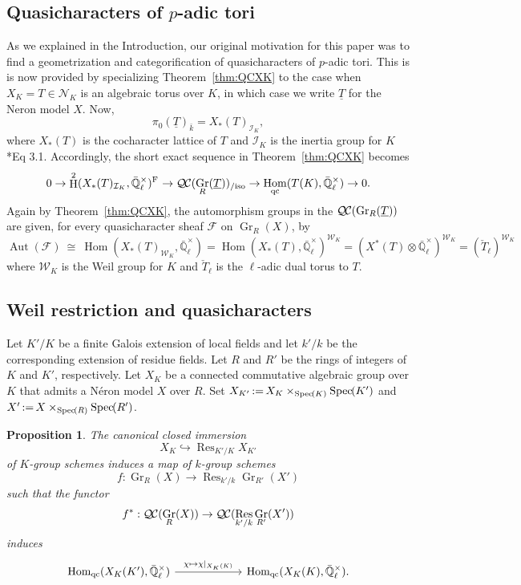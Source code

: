 \documentclass{amsart}
\theoremstyle{plain}
\newtheorem{proposition}[theorem]{Proposition}
\theoremstyle{definition}
\theoremstyle{remark}
\newcommand{\EE}{\mathbb{\bar Q}_\ell}
\newcommand{\bFq}{\bar{k}}
\newcommand{\Fq}{k}
\newcommand{\EEx}{\EE^\times}
\newcommand{\Weil}[1]{\mathcal{W}_{#1}}
\newcommand{\Frob}[1]{\operatorname{F}_{#1}}
\DeclareMathOperator{\Aut}{Aut}
\DeclareMathOperator{\Hom}{Hom}
\DeclareMathOperator{\Gr}{Gr}
\DeclareMathOperator{\Hh}{H}
\DeclareMathOperator{\Res}{Res}
\newcommand{\Spec}[1]{{\operatorname{Spec}\hskip-1pt( #1 )}}
\newcommand{\ceq}{{\, :=\, }}
\newcommand{\iso}{{\ \cong\ }}
\newcommand{\qcs}[1]{{\mathcal{#1}}}
\newcommand{\QC}{{\mathcal{Q\hskip-0.8pt C}}}
\newcommand{\QCiso}[1]{\QC(#1)_{/\text{iso}}}
\begin{document}
\subsection{Quasicharacters of $p$-adic tori}

As we explained in the Introduction, our original motivation for this paper was to find a geometrization and categorification of quasicharacters of $p$-adic tori. This is is now provided by specializing Theorem~\ref{thm:QCXK} to the case when $X_K= T\in \mathcal{N}_K$ is an algebraic torus over $K$, in which case we write $\underline{T}$ for the Neron model $X$. Now,
\[
 \pi_0(\underline{T})_{\bFq} = X_*(T)_{\mathcal{I}_K},
\]
where $X_*(T)$ is the cocharacter lattice of $T$ and $\mathcal{I}_K$ is the inertia group for $K$ \cite{bitan:discriminant}*{Eq 3.1}. 
Accordingly, the short exact sequence in Theorem~\ref{thm:QCXK} becomes
\begin{equation}
0 \to \Hh^2(X_*(T)_{\mathcal{I}_K},\EEx)^{\Frob{}} \to \QCiso{\Gr_R(\underline{T})} \to \Hom_\text{qc}(T(K),\EEx) \to 0.
\end{equation}
Again by Theorem~\ref{thm:QCXK}, the automorphism groups in the $\QC(\Gr_R(\underline{T}))$ are given, for every quasicharacter sheaf $\qcs{F}$ on $\Gr_R(X)$, by
\begin{equation}
\Aut(\qcs{F}) \iso \Hom(X_*(T)_{\Weil{K}},\EEx) = \Hom(X_*(T),\EEx)^{\Weil{K}} = (X^*(T)\otimes \EEx)^{\Weil{K}} = (\check{T}_\ell)^{\Weil{K}}
\end{equation}
where $\Weil{K}$ is the Weil group for $K$ and $\check{T}_\ell$ is the $\ell$-adic dual torus to $T$.



\subsection{Weil restriction and quasicharacters}\label{sec:wrK}

Let $K'/K$ be a finite Galois extension of local fields and
let $k'/k$ be the corresponding extension of residue fields.
Let $R$ and $R'$ be the rings of integers of $K$ and $K'$, respectively.
Let $X_K$ be a connected commutative algebraic group over $K$
that admits a Néron model $X$ over $R$.
Set $X_{K'} \ceq X_K \times_\Spec{K} \Spec{K'}$
and $X' \ceq X \times_\Spec{R} \Spec{R'}$.

\begin{proposition}\label{prop:wrK}
The canonical closed immersion 
\[
X_K \hookrightarrow \Res_{K'/K} X_{K'}
\]
of $K$-group schemes
induces a map of $\Fq$-group schemes 
\[
f : \Gr_R(X) \to \Res_{k'/k} \Gr_{R'}(X')
\] 
such that the functor
\[
f^* : \QC(\Gr_R(X)) \to \QC(\Res_{k'/k} \Gr_{R'}(X'))
\]
induces
\[
\begin{tikzcd}[column sep=60]
\Hom_{\text{qc}}(X_K(K'), \EEx) \arrow{r}{\chi \mapsto \chi\vert_{X_K(K)}} &\Hom_{\text{qc}}(X_K(K), \EEx).
\end{tikzcd}
\]
\end{proposition}
\end{document}
